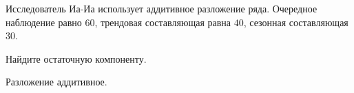 
\begin{question}
Исследователь Иа-Иа использует аддитивное разложение ряда.
Очередное наблюдение равно \(60\), трендовая составляющая равна \(40\),
сезонная составляющая \(30\).

Найдите остаточную компоненту.
\end{question}

\begin{solution}
Разложение аддитивное.
\end{solution}

